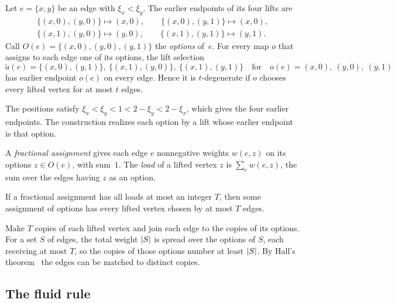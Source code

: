 \begin{lemma}[Options]\label{lem:options}
Let $e=\{x,y\}$ be an edge with $\xi_x<\xi_y$. The earlier endpoints of its four lifts are
\begin{gather*}
  \{(x,0),(y,0)\}\mapsto(x,0),\qquad \{(x,0),(y,1)\}\mapsto(x,0),\\
  \{(x,1),(y,0)\}\mapsto(y,0),\qquad \{(x,1),(y,1)\}\mapsto(y,1).
\end{gather*}
Call $O(e)=\{(x,0),(y,0),(y,1)\}$ the \emph{options} of~$e$. For every map $o$ that assigns to each edge one of its
options, the lift selection
\[
  \tilde a(e)=\{(x,0),(y,1)\},\ \{(x,1),(y,0)\},\ \{(x,1),(y,1)\}\quad\text{for}\quad o(e)=(x,0),\ (y,0),\ (y,1)
\]
has earlier endpoint $o(e)$ on every edge. Hence it is $t$-degenerate if $o$ chooses every lifted vertex for at most
$t$ edges.
\end{lemma}
\begin{outline}
The positions satisfy $\xi_x<\xi_y<1<2-\xi_y<2-\xi_x$, which gives the four earlier endpoints. The construction realizes
each option by a lift whose earlier endpoint is that option.
\end{outline}

A \emph{fractional assignment} gives each edge $e$ nonnegative weights $w(e,z)$ on its options $z\in O(e)$, with sum~$1$.
The \emph{load} of a lifted vertex $z$ is $\sum_ew(e,z)$, the sum over the edges having $z$ as an option.

\begin{lemma}[Rounding]\label{lem:rounding}
If a fractional assignment has all loads at most an integer $T$, then some assignment of options has every lifted
vertex chosen by at most $T$ edges.
\end{lemma}
\begin{outline}
Make $T$ copies of each lifted vertex and join each edge to the copies of its options. For a set $S$ of edges, the
total weight $\lvert S \rvert$ is spread over the options of $S$, each receiving at most $T$, so the copies of those options
number at least $\lvert S \rvert$. By Hall's theorem~\cite{Hall1935} the edges can be matched to distinct copies.
\end{outline}

\subsection{The fluid rule}\label{sec:lifts-fluid}


